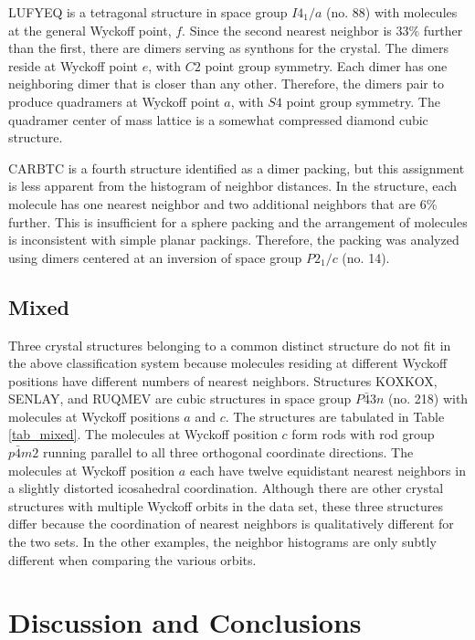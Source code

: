\documentclass{iucr}              %
\begin{document}
LUFYEQ is a tetragonal structure in space group $I4_1/a$ (no. 88) with molecules at the general Wyckoff point, $f$.  Since the second nearest neighbor is 33\% further than the first, there are dimers serving as synthons for the crystal.  The dimers reside at Wyckoff point $e$, with $C2$ point group symmetry.  Each dimer has one neighboring dimer that is closer than any other.  Therefore, the dimers pair to produce quadramers at Wyckoff point $a$, with $S4$ point group symmetry.  The quadramer center of mass lattice is a somewhat compressed diamond cubic structure.

CARBTC is a fourth structure identified as a dimer packing, but this assignment is less apparent from the histogram of neighbor distances.  In the structure, each molecule has one nearest neighbor and two additional neighbors that are 6\% further.  This is insufficient for a sphere packing and the arrangement of molecules is inconsistent with simple planar packings.  Therefore, the packing was analyzed using dimers centered at an inversion of space group $P2_1/c$ (no. 14).

\subsection{Mixed}

Three crystal structures belonging to a common distinct structure do not fit in the above classification system because molecules residing at different Wyckoff positions have different numbers of nearest neighbors.  Structures KOXKOX, SENLAY, and RUQMEV are cubic structures in space group $P\bar{4}3n$ (no. 218) with molecules at Wyckoff positions $a$ and $c$.  The structures are tabulated in Table \ref{tab_mixed}.  The molecules at Wyckoff position $c$ form rods with rod group $p\bar{4}m2$ running parallel to all three orthogonal coordinate directions.  The molecules at Wyckoff position $a$ each have twelve equidistant nearest neighbors in a slightly distorted icosahedral coordination.  Although there are other crystal structures with multiple Wyckoff orbits in the data set, these three structures differ because the coordination of nearest neighbors is qualitatively different for the two sets.  In the other examples, the neighbor histograms are only subtly different when comparing the various orbits.  


\section{Discussion and Conclusions}
\label{sec:Discussion}
\end{document}

